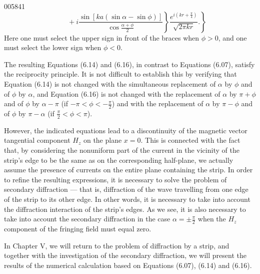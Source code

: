 \begin{scanpage}{0058}{41}
\[\left.\left.\qquad+i\frac{\sin[ka(\sin\alpha-\sin\phi)]}{\cos\frac{\alpha+\phi}{2}}\right\}\frac{e^{i(kr+\frac\pi4)}}{\sqrt{2\pi kr}}.\right\}\tag{6.16}\]
Here one must select the upper sign in front of the braces when $\phi>0$, and one must select the lower sign when $\phi<0$.

The resulting Equations (6.14) and (6.16), in contrast to Equations (6.07), satisfy the reciprocity principle. It is not difficult to establish this by verifying that Equation (6.14) is not changed with the simultaneous replacement of $\alpha$ by $\phi$ and of $\phi$ by $\alpha$, and Equation (6.16) is not changed with the replacement of $\alpha$ by $\pi+\phi$ and of $\phi$ by $\alpha-\pi$ (if $-\pi<\phi<-\frac\pi2$) and with the replacement of $\alpha$ by $\pi-\phi$ and of $\phi$ by $\pi-\alpha$ (if $\frac\pi2<\phi<\pi$).

However, the indicated equations lead to a discontinuity of the magnetic vector tangential component $H_z$ on the plane $x=0$. This is connected with the fact that, by considering the nonuniform part of the current in the vicinity of the strip's edge to be the same as on the corresponding half-plane, we actually assume the presence of currents on the entire plane containing the strip. In order to refine the resulting expressions, it is necessary to solve the problem of secondary diffraction --- that is, diffraction of the wave travelling from one edge of the strip to its other edge. In other words, it is necessary to take into account the diffraction interaction of the strip's edges. As we see, it is also necessary to take into account the secondary diffraction in the case $\alpha=\pm\frac\pi2$ when the $H_z$ component of the fringing field must equal zero.

In Chapter V, we will return to the problem of diffraction by a strip, and together with the investigation of the secondary diffraction, we will present the results of the numerical calculation based on Equations (6.07), (6.14) and (6.16).
\end{scanpage}
